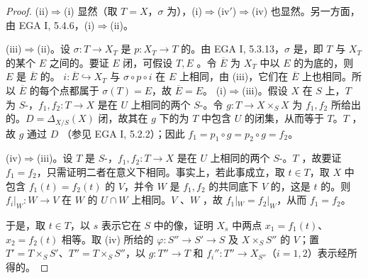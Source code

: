 \begin{proof}
(ii)$\Rightarrow$(i) 显然（取 $T=X$，$\sigma$ 为），(i)$\Rightarrow$(iv$'$)$\Rightarrow$(iv) 也显然。另一方面，由 EGA I, 5.4.6，(i)$\Rightarrow$(ii)。

(iii)$\Rightarrow$(ii)。设 $\sigma:T\to X_T$ 是 $p:X_T\to T$ 的。由 EGA I, 5.3.13，$\sigma$ 是，即 $T$ 与 $X_T$ 的某个 $E$ 之间的。要证 $E$ 闭，可假设 $T,E$ 。令 $\overline E$ 为 $X_T$ 中以 $E$ 的为底的，则 $E$ 是 $\overline E$ 的。 $i:\overline E\hookrightarrow X_T$ 与 $\sigma\circ p\circ i$ 在 $E$ 上相同，由 (iii)，它们在 $\overline E$ 上也相同。所以 $\overline E$ 的每个点都属于 $\sigma(T)=E$，故 $\overline E=E$。
(i)$\Rightarrow$(iii)。假设 $X$ 在 $S$ 上，$T$ 为 $S$-，$f_1,f_2:T\to X$ 是在 $U$ 上相同的两个 $S$-。令 $g:T\to X\times_SX$ 为 $f_1,f_2$ 所给出的。$D=\Delta_{X/S}(X)$ 闭，故其在 $g$ 下的为 $T$ 中包含 $U$ 的闭集，从而等于 $T$。$T$ ，故 $g$ 通过 $D$ （参见 EGA I, 5.2.2）；因此 $f_1=p_1\circ g=p_2\circ g=f_2$。

(iv)$\Rightarrow$(iii)。设 $T$ 是 $S$-，$f_1,f_2:T\to X$ 是在 $U$ 上相同的两个 $S$-。$T$ ，故要证 $f_1=f_2$，只需证明二者在意义下相同。事实上，若此事成立，取 $t\in T$，取 $X$ 中包含 $f_1(t)=f_2(t)$ 的 $V$，并令 $W$ 是 $f_1,f_2$ 的共同底下 $V$ 的，这是 $t$ 的。则 $f_i|_W:W\to V$ 在 $W$ 的 $U\cap W$ 上相同。$V$ 、$W$ ，故 $f_1|_W=f_2|_W$，从而 $f_1=f_2$。

于是，取 $t\in T$，以 $s$ 表示它在 $S$ 中的像，证明 $X_s$ 中两点 $x_1=f_1(t)$、$x_2=f_2(t)$ 相等。取 (iv) 所给的 $\varphi:S''\to S'\to S$ 及 $X\times_SS''$ 的 $V$；置 $T'=T\times_SS'$、$T''=T\times_SS''$，以 $g:T''\to T$ 和 $f_i'':T''\to X_{S''}$（$i=1,2$）表示经所得的。


\end{proof}
